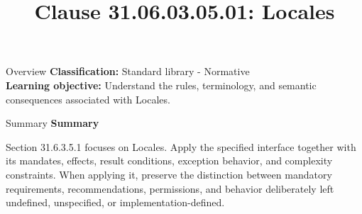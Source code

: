 \documentclass[10pt,letterpaper]{article}
\title{Clause 31.06.03.05.01: Locales}
\author{}
\date{}
\begin{document}
\maketitle
\begin{CornellOverviewBox}{Overview}
\textbf{Classification:} Standard library - Normative\\[2pt]
\textbf{Learning objective:} Understand the rules, terminology, and semantic consequences associated with Locales.
\end{CornellOverviewBox}\begin{CornellSummaryBox}{Summary}
{\sffamily\bfseries\color{Accent} Summary}\par\vspace{3pt}Section 31.6.3.5.1 focuses on Locales. Apply the specified interface together with its mandates, effects, result conditions, exception behavior, and complexity constraints. When applying it, preserve the distinction between mandatory requirements, recommendations, permissions, and behavior deliberately left undefined, unspecified, or implementation-defined.
\end{CornellSummaryBox}
\end{document}
